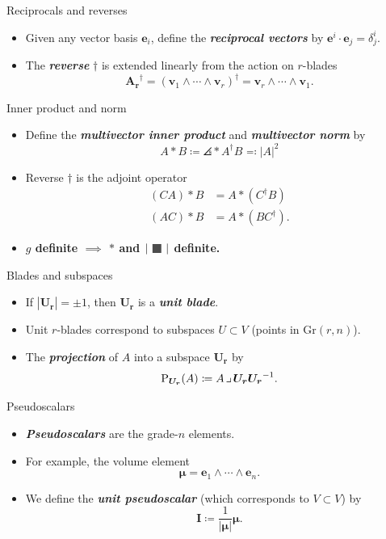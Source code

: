 \documentclass[aspectratio=169,handout]{beamer}
\makeatletter
\newcommand\boldgreen[1]{\textcolor{lighter_csu_green}{\emph{\textbf{#1}}}}
\newcommand\boldgold[1]{\textcolor{csu_gold}{\textbf{#1}}}
\newcommand{\Grassmannian}[2]{\textrm{Gr}(#1,#2)}
\newcommand{\projection}{\operatorname{P}}
\newcommand{\blade}[1]{\boldsymbol{#1}}
\newcommand{\pseudoscalar}{\blade{I}}
\newcommand{\contract}{\hspace*{.5mm} \lrcorner \hspace*{.5mm}}
\DeclarePairedDelimiter\angles{\langle}{\rangle}
\newcommand{\proj}[2]{\angles*{#2}_{#1}}
\def\mathcolor#1#{\@mathcolor{#1}}
\def\@mathcolor#1#2#3{%
  \protect\leavevmode
  \begingroup
    \color#1{#2}#3%
  \endgroup
}
\newcommand{\blank}{\raisebox{-.3ex}{\mathcolor{light-gray}{\text{\large$\blacksquare$}}}}
\makeatother
\begin{document}
\begin{frame}{Reciprocals and reverses}
\vfill
\begin{itemize}
\pause
\item Given any vector basis $\blade{e}_i$, define the \boldgreen{reciprocal vectors} by $\blade{e}^i\cdot \blade{e}_j = \delta^i_j$.
\pause
\item The \boldgreen{reverse} $\dagger$ is extended linearly from the action on $r$-blades
\[
\blade{A_r}^\dagger = (\blade{v}_1 \wedge \cdots \wedge\blade{v}_r)^\dagger = \blade{v}_r \wedge \cdots \wedge\blade{v}_1.
\]
\end{itemize}
\vfill
\end{frame}


\begin{frame}{Inner product and norm}
\vfill
\begin{itemize}
\pause
\item Define the \boldgreen{multivector inner product} and \boldgreen{multivector norm} by
\[
A \ast B \coloneqq \proj{}{A^\dagger B} \eqqcolon |A|^2
\]
\pause
\item Reverse $\dagger$ is the adjoint operator
\begin{align*}
(CA) \ast B &= A \ast (C^\dagger B)\\
(AC) \ast B &= A \ast (BC^\dagger).
\end{align*}
\pause
\item \boldgold{$g$ definite $\implies$ $\ast$ and $|\blank|$ definite.}
\end{itemize}
\vfill
\end{frame}

\begin{frame}{Blades and subspaces}
\vfill
\begin{itemize}
\pause
\item If $|\blade{U_r}|=\pm 1$, then $\blade{U_r}$ is a \boldgreen{unit blade}.
\pause
\item Unit $r$-blades correspond to subspaces $U\subset V$ (points in $\Grassmannian{r}{n}$).
\pause
\item The \boldgreen{projection} of $A$ into a subspace $\blade{U_r}$ by
\[
\projection_{\blade{U_r}} (A) \coloneqq A\contract \blade{U_r}\blade{U_r}^{-1}.
\]
\end{itemize}
\vfill
\end{frame}

\begin{frame}{Pseudoscalars}
\vfill
\begin{itemize}
\pause
\item \boldgreen{Pseudoscalars} are the grade-$n$ elements.
\pause
\item For example, the volume element
\[
\blade{\mu} = \blade{e}_1 \wedge \cdots \wedge \blade{e}_n.
\]
\pause
\item We define the \boldgreen{unit pseudoscalar} (which corresponds to $V\subset V$) by
\[
\pseudoscalar \coloneqq \frac{1}{|\blade{\mu}|} \blade{\mu}.
\]
\end{itemize}
\vfill
\end{frame}
\end{document}
